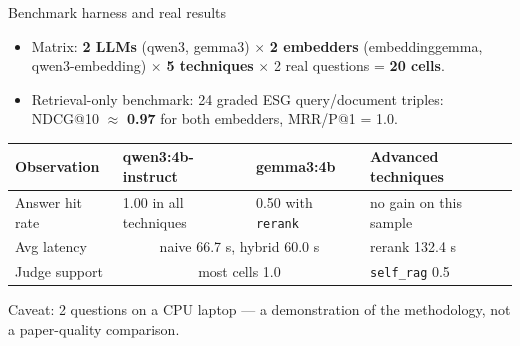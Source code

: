 \documentclass[aspectratio=169]{beamer}
\begin{document}
\begin{frame}{Benchmark harness and real results}
  \small
  \begin{itemize}
    \item Matrix: \textbf{2 LLMs} (qwen3, gemma3) $\times$ \textbf{2 embedders} (embeddinggemma, qwen3-embedding) $\times$ \textbf{5 techniques} $\times$ 2 real questions = \textbf{20 cells}.
    \item Retrieval-only benchmark: 24 graded ESG query/document triples: NDCG@10 $\approx$ \textbf{0.97} for both embedders, MRR/P@1 = 1.0.
  \end{itemize}
  \vspace{1mm}
  \begin{table}
    \centering
    \footnotesize
    \begin{tabular}{p{}p{}p{}p{}}
    \toprule
    Observation & qwen3:4b-instruct & gemma3:4b & Advanced techniques \\
    \midrule
    Answer hit rate & 1.00 in all techniques & 0.50 with \texttt{rerank} & no gain on this sample \\
    Avg latency & \multicolumn{2}{c}{naive 66.7 s, hybrid 60.0 s} & rerank 132.4 s \\
    Judge support & \multicolumn{2}{c}{most cells 1.0} & \texttt{self\_rag} 0.5 \\
    \bottomrule
    \end{tabular}
  \end{table}
  \vspace{1mm}
  \scriptsize Caveat: 2 questions on a CPU laptop --- a demonstration of the methodology, not a paper-quality comparison.
\end{frame}
\end{document}
